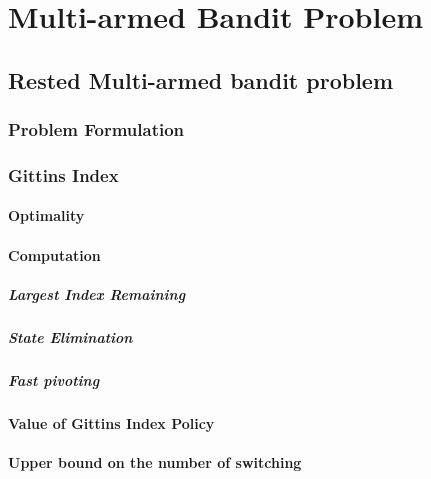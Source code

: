 \chapter{Multi-armed Bandit Problem}
\label{ch:mab_problem}

\section{Rested Multi-armed bandit problem}
\label{sec:rested_mab_pb}

\subsection{Problem Formulation}
\label{subsec:rested_pb_formul}

\subsection{Gittins Index}
\label{subsec:gittins_idx}

\subsubsection{Optimality}

\subsubsection{Computation}

\paragraph{Largest Index Remaining}

\paragraph{State Elimination}

\paragraph{Fast pivoting}

\subsubsection{Value of Gittins Index Policy}

\subsubsection{Upper bound on the number of switching}

